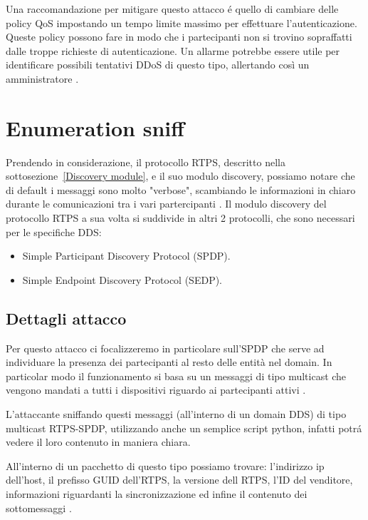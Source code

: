 Una raccomandazione per mitigare questo attacco é quello di cambiare delle
policy QoS impostando un tempo limite massimo per effettuare
l'autenticazione. Queste policy possono fare in modo
che i partecipanti non si trovino sopraffatti dalle troppe richieste di
autenticazione. Un allarme potrebbe essere utile per identificare possibili
tentativi DDoS di questo tipo, allertando così un amministratore
\cite{DBLP:conf/asiaccs/WangLG24}.


\section{Enumeration sniff}
Prendendo in considerazione, il protocollo RTPS,
descritto nella sottosezione~\ref{Discovery module}, e il suo modulo discovery,
possiamo notare che di default i messaggi sono molto "verbose", 
scambiando le informazioni in
chiaro durante le comunicazioni tra i vari partercipanti \cite{White2017AnII}.
Il modulo 
discovery del protocollo RTPS a sua volta si suddivide in
altri 2 protocolli, che sono necessari per le specifiche DDS:
\begin{itemize}
    \item Simple Participant Discovery Protocol (SPDP).
    \item Simple Endpoint Discovery Protocol (SEDP).
\end{itemize}



\subsection{Dettagli attacco}
Per questo attacco ci focalizzeremo in particolare sull'SPDP che serve ad
individuare la presenza dei partecipanti al resto delle
entità nel domain. In particolar modo
il funzionamento si basa su un messaggi di tipo multicast che vengono
mandati a tutti i dispositivi riguardo ai partecipanti attivi
\cite{ddsrtps}.

L'attaccante sniffando questi messaggi (all'interno di un domain DDS)
di tipo multicast RTPS-SPDP,
utilizzando anche un semplice script python, infatti potrá 
vedere il loro contenuto in maniera chiara.

All'interno di un pacchetto di questo tipo possiamo trovare:
l'indirizzo ip dell'host, il prefisso GUID dell'RTPS,
la versione dell RTPS, l'ID del venditore, informazioni riguardanti la sincronizzazione
ed infine il contenuto dei sottomessaggi \cite{White2017AnII}.


